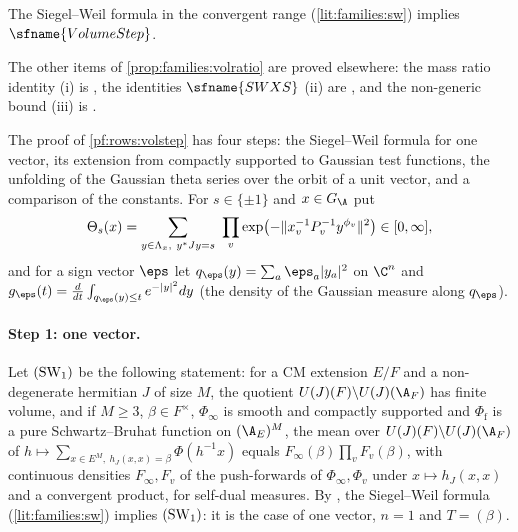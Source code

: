 \begin{proposition}\label{pf:rows:volstep}
The Siegel--Weil formula in the convergent range (\cref{lit:families:sw}) implies $\sfname{VolumeStep}$.
\end{proposition}

The other items of \cref{prop:families:volratio} are proved elsewhere: the mass ratio identity (i) is
, the identities $\sfname{SWXS}$ (ii) are
, and the non-generic bound (iii) is
.

The proof of \cref{pf:rows:volstep} has four steps: the Siegel--Weil formula for one vector, its extension from
compactly supported to Gaussian test functions, the unfolding of the Gaussian theta series over the orbit of a unit
vector, and a comparison of the constants. For $s\in\{\pm1\}$ and $x\in\rowsGA$ put
\[
\Theta_s(x)=\sum_{y\in\rowsLv_x,\ y^*Jy=s}\ \prod_v\exp\bigl(-\|x_v^{-1}P_v^{-1}y^{\phi_v}\|^2\bigr)\in[0,\infty],
\]
and for a sign vector $\eps$ let $q_\eps(y)=\sum_a\eps_a|y_a|^2$ on $\C^n$ and
$g_\eps(t)=\frac{d}{dt}\int_{q_\eps(y)\le t}e^{-|y|^2}dy$ (the density of the Gaussian measure along $q_\eps$).

\paragraph{Step 1: one vector.}
Let $(\mathrm{SW}_1)$ be the following statement: for a CM extension $E/F$ and a non-degenerate hermitian $J$ of size $M$,
the quotient $U(J)(F)\backslash U(J)(\A_F)$ has finite volume, and if $M\ge3$, $\beta\in F^\times$, $\Phi_\infty$ is smooth and
compactly supported and $\Phi_{\mathrm f}$ is a pure Schwartz--Bruhat function on $(\A_E)^M$, the mean over
$U(J)(F)\backslash U(J)(\A_F)$ of $h\mapsto\sum_{x\in E^M,\ h_J(x,x)=\beta}\Phi(h^{-1}x)$ equals
$F_\infty(\beta)\prod_vF_v(\beta)$, with continuous densities $F_\infty,F_v$ of the push-forwards of $\Phi_\infty,\Phi_v$
under $x\mapsto h_J(x,x)$ and a convergent product, for self-dual measures. By
, the Siegel--Weil formula (\cref{lit:families:sw}) implies
$(\mathrm{SW}_1)$: it is the case of one vector, $n=1$ and $T=(\beta)$.

